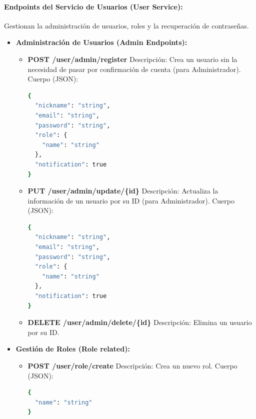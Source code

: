 \paragraph{\textbf{Endpoints del Servicio de Usuarios (User Service):}}
Gestionan la administración de usuarios, roles y la recuperación de contraseñas.
\begin{itemize}
    \item \textbf{Administración de Usuarios (Admin Endpoints):}
    \begin{itemize}
        \item \textbf{POST /user/admin/register}
        \newline Descripción: Crea un usuario sin la necesidad de pasar por confirmación de cuenta (para Administrador).
        \newline Cuerpo (JSON):
\begin{lstlisting}[language=bash]
{
  "nickname": "string",
  "email": "string",
  "password": "string",
  "role": {
    "name": "string"
  },
  "notification": true
}
\end{lstlisting}

        \item \textbf{PUT /user/admin/update/\{id\}}
        \newline Descripción: Actualiza la información de un usuario por su ID (para Administrador).
        \newline Cuerpo (JSON):
\begin{lstlisting}[language=bash]
{
  "nickname": "string",
  "email": "string",
  "password": "string",
  "role": {
    "name": "string"
  },
  "notification": true
}
\end{lstlisting}

        \item \textbf{DELETE /user/admin/delete/\{id\}}
        \newline Descripción: Elimina un usuario por su ID.
    \end{itemize}
    
    \item \textbf{Gestión de Roles (Role related):}
    \begin{itemize}
        \item \textbf{POST /user/role/create}
        \newline Descripción: Crea un nuevo rol.
        \newline Cuerpo (JSON):
\begin{lstlisting}[language=bash]
{
  "name": "string"
}
\end{lstlisting}


\end{itemize}
\end{itemize}
